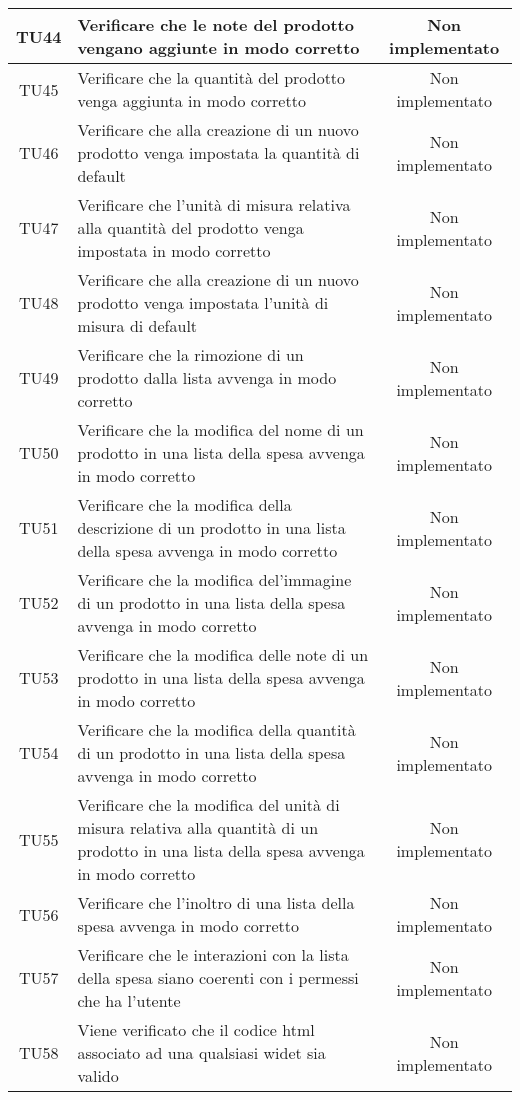 \begin{center}
\begin{longtable}{|c|>{\centering}m{10cm}|c|}
		TU44 & Verificare che le note del prodotto vengano aggiunte in modo corretto & Non implementato \\ \hline
		TU45 & Verificare che la quantità del prodotto venga aggiunta in modo corretto & Non implementato \\ \hline
		TU46 & Verificare che alla creazione di un nuovo prodotto venga impostata la quantità di default & Non implementato \\ \hline
		TU47 & Verificare che l'unità di misura relativa alla quantità del prodotto venga impostata in modo corretto & Non implementato \\ \hline
		TU48 & Verificare che alla creazione di un nuovo prodotto venga impostata l'unità di misura di default & Non implementato \\ \hline
		TU49 & Verificare che la rimozione di un prodotto dalla lista avvenga in modo corretto & Non implementato \\ \hline
		TU50 & Verificare che la modifica del nome di un prodotto in una lista della spesa avvenga in modo corretto & Non implementato \\ \hline
		TU51 & Verificare che la modifica della descrizione di un prodotto in una lista della spesa avvenga in modo corretto & Non implementato \\ \hline
		TU52 & Verificare che la modifica del'immagine di un prodotto in una lista della spesa avvenga in modo corretto & Non implementato \\ \hline
		TU53 & Verificare che la modifica delle note di un prodotto in una lista della spesa avvenga in modo corretto & Non implementato \\ \hline
		TU54 & Verificare che la modifica della quantità di un prodotto in una lista della spesa avvenga in modo corretto & Non implementato \\ \hline
		TU55 & Verificare che la modifica del unità di misura relativa alla quantità di un prodotto in una lista della spesa avvenga in modo corretto & Non implementato \\ \hline
		TU56 & Verificare che l'inoltro di una lista della spesa avvenga in modo corretto & Non implementato \\ \hline
		TU57 & Verificare che le interazioni con la lista della spesa siano coerenti con i permessi che ha l'utente & Non implementato \\ \hline
		TU58 & Viene verificato che il codice html associato ad una qualsiasi widet sia valido & Non implementato \\ \hline
	\end{longtable}
\end{center}
